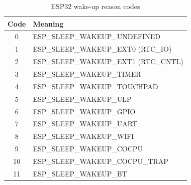 \documentclass[11pt,a4paper]{article}
\begin{document}
\begin{table}[h]
\centering
\begin{tabular}{|c|l|}
\hline
Code & Meaning \\
\hline
0 & ESP\_SLEEP\_WAKEUP\_UNDEFINED \\
1 & ESP\_SLEEP\_WAKEUP\_EXT0 (RTC\_IO) \\
2 & ESP\_SLEEP\_WAKEUP\_EXT1 (RTC\_CNTL) \\
3 & ESP\_SLEEP\_WAKEUP\_TIMER \\
4 & ESP\_SLEEP\_WAKEUP\_TOUCHPAD \\
5 & ESP\_SLEEP\_WAKEUP\_ULP \\
6 & ESP\_SLEEP\_WAKEUP\_GPIO \\
7 & ESP\_SLEEP\_WAKEUP\_UART \\
8 & ESP\_SLEEP\_WAKEUP\_WIFI \\
9 & ESP\_SLEEP\_WAKEUP\_COCPU \\
10 & ESP\_SLEEP\_WAKEUP\_COCPU\_TRAP \\
11 & ESP\_SLEEP\_WAKEUP\_BT \\
\hline
\end{tabular}
\caption{ESP32 wake-up reason codes}
\end{table}
\end{document}
